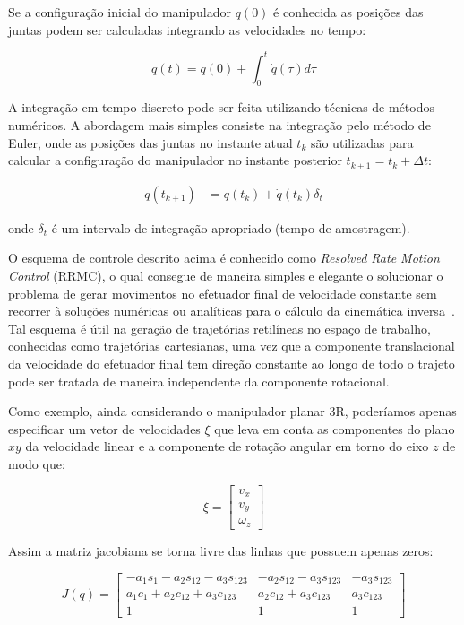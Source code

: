 Se a configuração inicial do manipulador \(q(0)\) é conhecida as posições das
juntas podem ser calculadas integrando as velocidades no tempo:

\begin{equation}
    q(t) = q(0) + \int_{0}^{t} \dot{q}(\tau) d\tau
\end{equation}

A integração em tempo discreto pode ser feita utilizando técnicas de métodos
numéricos. A abordagem mais simples consiste na integração pelo método de
Euler, onde as posições das juntas no instante atual \(t_k\) são utilizadas
para calcular a configuração do manipulador no instante posterior \(t_{k+1} =
t_k + \Delta t\):

\begin{align}
    q(t_{k + 1}) & = q(t_k) + \dot{q}(t_k) \delta_t
\end{align}

onde \(\delta_t\) é um intervalo de integração apropriado (tempo de
amostragem).

O esquema de controle descrito acima é conhecido como \emph{Resolved Rate Motion Control} (RRMC), o qual consegue de 
maneira simples e elegante o solucionar o problema de gerar movimentos no efetuador final de velocidade constante sem recorrer à
soluções numéricas ou analíticas para o cálculo da cinemática inversa~\cite{corke_robotics_2023}. 
Tal esquema é útil na geração de trajetórias retilíneas no espaço de trabalho,
conhecidas como trajetórias cartesianas, uma vez que a componente translacional
da velocidade do efetuador final tem direção constante ao longo de todo o
trajeto pode ser tratada de maneira independente da componente rotacional.

Como exemplo, ainda considerando o manipulador planar 3R, poderíamos apenas
especificar um vetor de velocidades \(\xi\) que leva em conta as componentes do
plano \(xy\) da velocidade linear e a componente de rotação angular em torno do
eixo \(z\) de modo que:

\begin{equation}
    \xi = \begin{bmatrix}
        v_x \\
        v_y \\
        \omega_z
    \end{bmatrix}
\end{equation}

Assim a matriz jacobiana se torna livre das linhas que possuem apenas zeros:

\begin{equation}
    J(q) = \begin{bmatrix}
        -a_1 s_1 - a_2 s_{12} - a_3 s_{123} & -a_2 s_{12} - a_3 s_{123} & -a_3 s_{123} \\
        a_1 c_1 + a_2 c_{12} + a_3 c_{123}  & a_2 c_{12} + a_3 c_{123}  & a_3 c_{123}  \\
        1                                   & 1                         & 1
    \end{bmatrix}
\end{equation}

